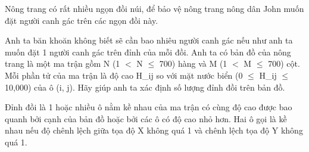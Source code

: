 Nông trang có rất nhiều ngọn đồi núi, để bảo vệ nông trang nông dân John muốn đặt người canh gác trên các ngọn đồi này.  

   Anh ta băn khoăn không biết sẽ cần bao nhiêu người canh gác nếu như anh ta muốn đặt 1 người canh gác trên đỉnh của mỗi đồi. Anh ta có bản đồ của nông trang là một ma trận gồm N (1 $<$ N  $\le$  700) hàng và M (1 $<$ M  $\le$  700) cột. Mỗi phần tử của ma trận là độ cao H\_ij so với mặt nước biển (0  $\le$  H\_ij  $\le$  10,000) của ô (i, j). Hãy giúp anh ta xác định số lượng đỉnh đồi trên bản đồ.  

   Đỉnh đồi là 1 hoặc nhiều ô nằm kề nhau của ma trận có cùng độ cao được bao quanh bởi cạnh của bản đồ hoặc bởi các ô có độ cao nhỏ hơn. Hai ô gọi là kề nhau nếu độ chênh lệch giữa tọa độ X không quá 1 và chênh lệch tọa độ Y không quá 1.